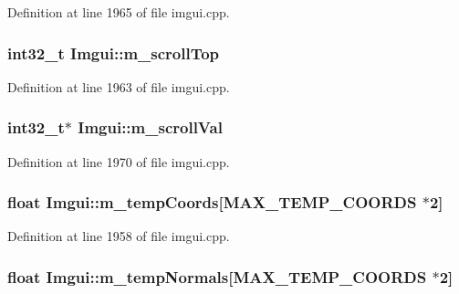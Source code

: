 Definition at line 1965 of file imgui.\+cpp.

\hypertarget{struct_imgui_a8ea061e73972317ffdbae708cfea6acc}{
\subsubsection[{m\+\_\+scroll\+Top}]{\setlength{\rightskip}{0pt plus 5cm}int32\+\_\+t Imgui\+::m\+\_\+scroll\+Top}}\label{struct_imgui_a8ea061e73972317ffdbae708cfea6acc}


Definition at line 1963 of file imgui.\+cpp.

\hypertarget{struct_imgui_ace428922eb784a2e660c1db562ee39bc}{
\subsubsection[{m\+\_\+scroll\+Val}]{\setlength{\rightskip}{0pt plus 5cm}int32\+\_\+t$\ast$ Imgui\+::m\+\_\+scroll\+Val}}\label{struct_imgui_ace428922eb784a2e660c1db562ee39bc}


Definition at line 1970 of file imgui.\+cpp.

\hypertarget{struct_imgui_aa3b9f011f9b3de1ca858e33207a4b833}{
\subsubsection[{m\+\_\+temp\+Coords}]{\setlength{\rightskip}{0pt plus 5cm}float Imgui\+::m\+\_\+temp\+Coords\mbox{[}{\bf M\+A\+X\+\_\+\+T\+E\+M\+P\+\_\+\+C\+O\+O\+R\+D\+S} $\ast$2\mbox{]}}}\label{struct_imgui_aa3b9f011f9b3de1ca858e33207a4b833}


Definition at line 1958 of file imgui.\+cpp.

\hypertarget{struct_imgui_a19066c64797331e561d4777a255ba382}{
\subsubsection[{m\+\_\+temp\+Normals}]{\setlength{\rightskip}{0pt plus 5cm}float Imgui\+::m\+\_\+temp\+Normals\mbox{[}{\bf M\+A\+X\+\_\+\+T\+E\+M\+P\+\_\+\+C\+O\+O\+R\+D\+S} $\ast$2\mbox{]}}}\label{struct_imgui_a19066c64797331e561d4777a255ba382}



